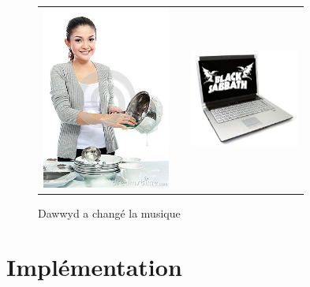 \documentclass{beamer}
\begin{document}
\begin{frame}
\begin{figure}
    \caption{Dawwyd a changé la musique}
    \begin{tabular}{ccc}
        \includegraphics[height=6cm]{mains_mouillees} & & \includegraphics[height=3.2cm]{laptop_music_2}
    \end{tabular}
\end{figure}

\end{frame}

\section{Implémentation}
\end{document}
